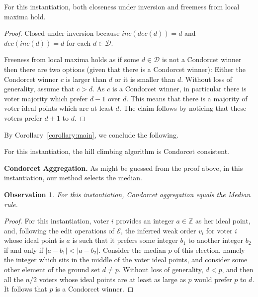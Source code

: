 \documentclass[sigconf]{aamas}  %
\newtheorem{observation}{Observation}
\newcommand{\mypara}[1]{\smallskip\noindent\textbf{#1.}}
\newcommand{\calD}{\mathcal{D}}
\newcommand{\calE}{\mathcal{E}}
\begin{document}
\begin{lemma}
  For this instantiation, both closeness under inversion and freemess from local maxima hold.
\end{lemma}

\begin{proof}
%
Closed under inversion because $inc(dec(d)) = d$ and $dec(inc(d)) = d$ for each $d \in \calD$.

Freeness from local maxima holds as if some $d \in \calD$ is not a Condorcet winner then there are two options (given that there is a Condorcet winner):
  Either the Condorcet winner $c$ is larger than $d$ or it is smaller than $d$.
Without loss of generality, assume that $c > d$.
As $c$ is a Condorcet winner, in particular there is voter majority which prefer $d - 1$ over $d$.
This means that there is a majority of voter ideal points which are at least $d$.
The claim follows by noticing that these voters prefer $d + 1$ to $d$.
%
\end{proof}

By Corollary~\ref{corollary:main}, we conclude the following.

\begin{corollary}
  For this instantiation, the hill climbing algorithm is Condorcet consistent.
\end{corollary}


\mypara{Condorcet Aggregation}
%
As might be guessed from the proof above, in this instantiation, our method selects the median.

\begin{observation}
  For this instantiation, Condorcet aggregation equals the Median rule.
\end{observation}

\begin{proof}
%
For this instantiation, voter $i$ provides an integer $a \in \mathbb{Z}$ as her ideal point,
and, following the edit operations of $\calE$, the inferred weak order $v_i$ for voter $i$ whose ideal point is $a$ is such that it prefers some integer $b_1$ to another integer $b_2$
if and only if $|a - b_1| < |a - b_2|$.
Consider the median $p$ of this election,
namely the integer which sits in the middle of the voter ideal points,
and consider some other element of the ground set $d \neq p$.
Without loss of generality, $d < p$,
and then all the $n / 2$ voters whose ideal points are at least as large as $p$ would prefer $p$ to $d$.
It follows that $p$ is a Condorcet winner.
%
\end{proof}
\end{document}
